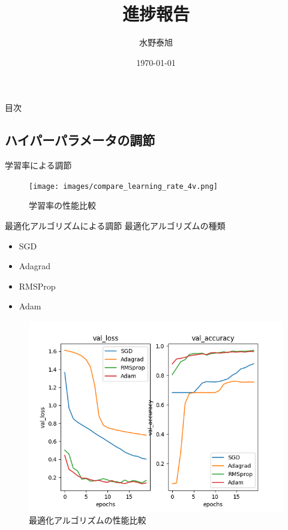 \documentclass[dvipdfmx]{beamer}
\title{進捗報告}
\date{\today}
\author{水野泰旭}
\institute{弘前大学理工学部電子情報工学科４年}
\begin{document}
  \maketitle

  \begin{frame}{目次}
    \tableofcontents
   \end{frame}

  \begin{frame}
    \section{ハイパーパラメータの調節}
  \end{frame} 
  
  \begin{frame}{学習率による調節}
    \begin{figure}
      \centering
      \texttt{[image: images/compare\_learning\_rate\_4v.png]}
      \caption{学習率の性能比較}
      \label{fig:compare_lr}
    \end{figure}
  \end{frame}

  \begin{frame}{最適化アルゴリズムによる調節}
    最適化アルゴリズムの種類
    \begin{itemize}
      \item SGD
      \item Adagrad
      \item RMSProp
      \item Adam
    \end{itemize}
  \end{frame}

  \begin{frame}
    \begin{figure}
      \centering
      \includegraphics[keepaspectratio, scale=0.6]{images/compare_learning_rate_optimizer.png}
      \caption{最適化アルゴリズムの性能比較}
    \end{figure}
  \end{frame}
\end{document}
